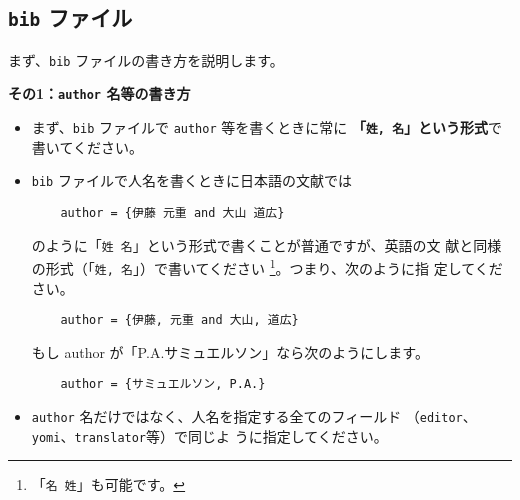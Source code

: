 \documentclass[a4paper,10pt]{bxjsarticle}
\begin{document}
\subsection{\texttt{bib} ファイル}

まず、\texttt{bib} ファイルの書き方を説明します。
\vspace*{1em}

\textbf{その1：\texttt{author} 名等の書き方}
\begin{itemize}
 \item まず、\texttt{bib} ファイルで \texttt{author} 等を書くときに常に
       \textbf{「\texttt{姓,\ 名}」という形式}で書いてください。
 \item \texttt{bib} ファイルで人名を書くときに日本語の文献では
\begin{verbatim}
    author = {伊藤 元重 and 大山 道広}
\end{verbatim}
       のように「\verb|姓 名|」という形式で書くことが普通ですが、英語の文
       献と同様の形式（「\verb|姓, 名|」）で書いてください
       \footnote{「\texttt{名\ 姓}」も可能です。}。つまり、次のように指
       定してください。
\begin{verbatim}
    author = {伊藤, 元重 and 大山, 道広}
\end{verbatim}
       もし author が「P.A.サミュエルソン」なら次のようにします。
\begin{verbatim}
    author = {サミュエルソン, P.A.}
\end{verbatim}
 \item \texttt{author} 名だけではなく、人名を指定する全てのフィールド
       （\texttt{editor}、\texttt{yomi}、\texttt{translator}等）で同じよ
       うに指定してください。
\end{itemize}

\vspace*{1em}
\end{document}
